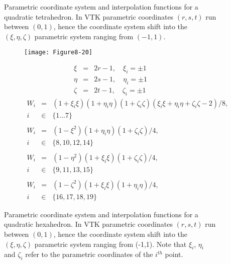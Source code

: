 \begin{description}
\begin{figure}[!htb]
\begin{subfigure}{0.48\linewidth}
        \end{subfigure}%
        \caption{Parametric coordinate system and interpolation functions for a quadratic tetrahedron. In VTK parametric coordinates $(r,s,t)$ run between $(0,1)$, hence the coordinate system shift into the $(\xi, \eta, \zeta)$ parametric system ranging from $(-1,1)$.}
        \label{fig:Figure8-19}
    \end{figure}

    \begin{figure}[!htb]
        \centering
        \begin{subfigure}{0.48\linewidth}
            \centering
            \texttt{[image: Figure8-20]}
            \caption*{}
        \end{subfigure}
        \hfill
        \begin{subfigure}{0.48\linewidth}
            \begin{equation*}
            \begin{array}{lll}
            \xi &=& 2r  - 1,\quad \xi_i = \pm1 \\
            \eta &=& 2 s - 1,\quad \eta_i = \pm1 \\
            \zeta &=& 2 t - 1,\quad \zeta_i = \pm1
            \end{array}
            \end{equation*}
            \begin{equation*}
            \begin{array}{lll}
            W_i &=& (1 + \xi_i \xi)(1 + \eta_i \eta)(1 + \zeta_i \zeta)(\xi_i \xi + \eta_i \eta + \zeta_i \zeta - 2)/8, \\
            i &\in& \lbrace 1 \ldots 7 \rbrace \\ \\
            W_i &=& (1 - \xi^2)(1 + \eta_i \eta)(1 + \zeta_i \zeta)/4, \\
            i &\in& \lbrace 8, 10, 12, 14 \rbrace \\ \\
            W_i &=& (1 - \eta^2)(1 + \xi_i \xi)(1 + \zeta_i \zeta)/4, \\
            i &\in& \lbrace 9, 11, 13, 15 \rbrace \\ \\
            W_i &=& (1 - \zeta^2)(1 + \xi_i \xi)(1 + \eta_i \eta)/4, \\
            i &\in& \lbrace 16, 17, 18, 19 \rbrace
            \end{array}
            \end{equation*}
        \end{subfigure}%
        \caption{Parametric coordinate system and interpolation functions for a quadratic hexahedron. In VTK parametric coordinates $(r,s,t)$ run between $(0,1)$, hence the coordinate system shift into the $(\xi, \eta, \zeta)$ parametric system ranging from (-1,1). Note that $\xi_i$, $\eta_i$ and $\zeta_i$ refer to the parametric coordinates of the $i^{th}$ point.}
        \label{fig:Figure8-20}
    \end{figure}


\end{description}
